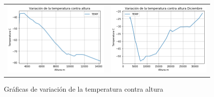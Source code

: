 \documentclass[a4paper]{article}
\begin{document}
\begin{figure}[h]
\begin{tabular}{ll}
\includegraphics[scale=0.5]{grafica3.png}
&
\includegraphics[scale=0.5]{grafica4.png}
\end{tabular}
\caption{Gráficas de variación de la temperatura contra altura}

\end{figure}
\end{document}
